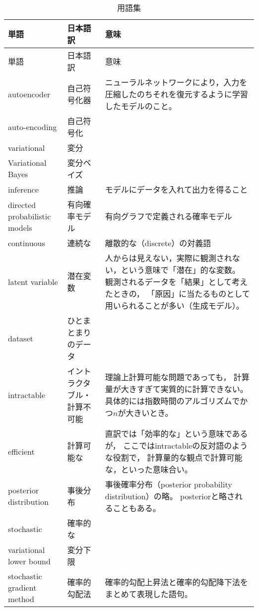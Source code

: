 \documentclass[dvipdfmx, fleqn]{jsarticle}
\begin{document}
\begin{longtable}{lp{4cm}p{7cm}}
    \caption{用語集}
    \label{tab:terms}
    \\ \hline
    単語 & 日本語訳 & 意味 \tabularnewline \hline \hline
    \endfirsthead
    単語 & 日本語訳 & 意味 \tabularnewline \hline \hline
    \endhead
        autoencoder
            & 自己符号化器
            & ニューラルネットワークにより，入力を圧縮したのちそれを復元するように学習したモデルのこと。
            \tabularnewline \hline
        auto-encoding
            & 自己符号化
            & 
            \tabularnewline \hline
        variational
            & 変分
            & 
            \tabularnewline \hline
        Variational Bayes
            & 変分ベイズ
            & 
            \tabularnewline \hline
        inference
            & 推論
            & モデルにデータを入れて出力を得ること
            \tabularnewline \hline
        directed probabilistic models
            & 有向確率モデル
            & 有向グラフで定義される確率モデル
            \tabularnewline \hline
        continuous
            & 連続な
            & 離散的な（discrete）の対義語
            \tabularnewline \hline
        latent variable
            & 潜在変数
            & 人からは見えない，実際に観測されない，という意味で「潜在」的な変数。
            観測されるデータを「結果」として考えたときの，
            「原因」に当たるものとして用いられることが多い（生成モデル）。
            \tabularnewline \hline
        dataset
            & ひとまとまりのデータ
            & 
            \tabularnewline \hline
        intractable
            & イントラクタブル・計算不可能
            & 理論上計算可能な問題であっても，
            計算量が大きすぎて実質的に計算できない。
            具体的には指数時間のアルゴリズムでかつ\(n\)が大きいとき。
            \tabularnewline \hline
        efficient
            & 計算可能な
            & 直訳では「効率的な」という意味であるが，
            ここではintractableの反対語のような役割で，
            計算量的な観点で計算可能な，といった意味合い。
            \tabularnewline \hline
        posterior distribution
            & 事後分布
            & 事後確率分布（posterior probability distribution）の略。
            posteriorと略されることもある。
            \tabularnewline \hline
        stochastic
            & 確率的な
            & 
            \tabularnewline \hline
        variational lower bound
            & 変分下限
            & 
            \tabularnewline \hline
        stochastic gradient method
            & 確率的勾配法
            & 確率的勾配上昇法と確率的勾配降下法をまとめて表現した語句。

\end{longtable}
\end{document}
